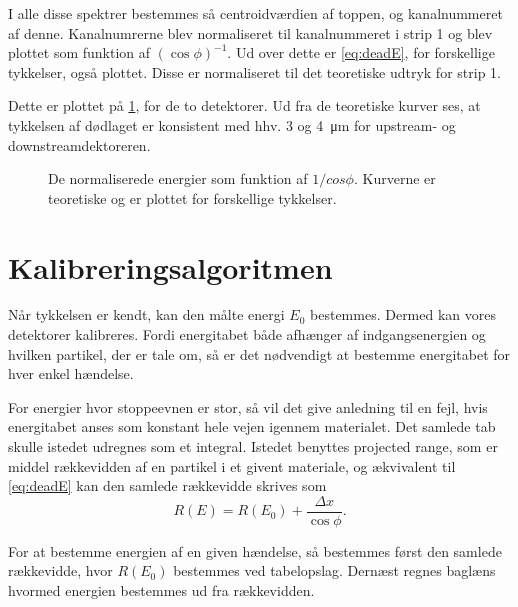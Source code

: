 I alle disse spektrer bestemmes så centroidværdien af \Pu toppen, og kanalnummeret af denne.
Kanalnumrerne blev normaliseret til kanalnummeret i strip 1 og blev plottet som funktion af
$(\cos \phi)^{-1}$. Ud over dette er \cref{eq:deadE}, for forskellige tykkelser, også plottet. Disse er
normaliseret til det teoretiske udtryk for strip 1.

Dette er plottet på \cref{fig:dead}, for de to detektorer. Ud fra de teoretiske kurver ses, at tykkelsen
af dødlaget er konsistent med hhv. 3 og \SI{4}{\um} for upstream- og downstreamdektoreren.

\begin{figure}
  \centering
  \hfill
  \caption{De normaliserede energier som funktion af $1/cos\phi$. Kurverne er teoretiske og er plottet
    for forskellige tykkelser.}
  \label{fig:dead}
\end{figure}


\section{Kalibreringsalgoritmen}
\label{sec:kalalgo}

Når tykkelsen er kendt, kan den målte energi $E_{0}$ bestemmes. Dermed kan vores detektorer
kalibreres. Fordi energitabet både afhænger af indgangsenergien og hvilken partikel, der er tale
om, så er det nødvendigt at bestemme energitabet for hver enkel hændelse.

For energier hvor stoppeevnen er stor, så vil det give anledning til en fejl, hvis energitabet anses
som konstant hele vejen igennem materialet. Det samlede tab skulle istedet udregnes som et
integral. Istedet benyttes projected range, som er middel rækkevidden af en partikel i et givent
materiale, og ækvivalent til \cref{eq:deadE} kan den samlede rækkevidde skrives som
\begin{equation}
  \label{eq:deadR}
  R(E) = R(E_{0}) + \frac{\Delta x}{\cos \phi} .
\end{equation}

For at bestemme energien af en given hændelse, så bestemmes først den samlede rækkevidde, hvor
$R(E_{0})$ bestemmes ved tabelopslag. Dernæst regnes baglæns hvormed energien bestemmes ud fra
rækkevidden. 










